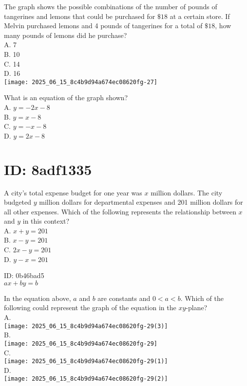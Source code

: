 The graph shows the possible combinations of the number of pounds of tangerines and lemons that could be purchased for $\$ 18$ at a certain store. If Melvin purchased lemons and 4 pounds of tangerines for a total of $\$ 18$, how many pounds of lemons did he purchase?\\
A. 7\\
B. 10\\
C. 14\\
D. 16\\
\texttt{[image: 2025\_06\_15\_8c4b9d94a674ec08620fg-27]}

What is an equation of the graph shown?\\
A. $y=-2 x-8$\\
B. $y=x-8$\\
C. $y=-x-8$\\
D. $y=2 x-8$

\section*{ID: 8adf1335}
A city's total expense budget for one year was $x$ million dollars. The city budgeted $y$ million dollars for departmental expenses and 201 million dollars for all other expenses. Which of the following represents the relationship between $x$ and $y$ in this context?\\
A. $x+y=201$\\
B. $x-y=201$\\
C. $2 x-y=201$\\
D. $y-x=201$

ID: 0b46bad5\\
$a x+b y=b$

In the equation above, $a$ and $b$ are constants and $0<a<b$. Which of the following could represent the graph of the equation in the $x y$-plane?\\
A.\\
\texttt{[image: 2025\_06\_15\_8c4b9d94a674ec08620fg-29(3)]}\\
B.\\
\texttt{[image: 2025\_06\_15\_8c4b9d94a674ec08620fg-29]}\\
C.\\
\texttt{[image: 2025\_06\_15\_8c4b9d94a674ec08620fg-29(1)]}\\
D.\\
\texttt{[image: 2025\_06\_15\_8c4b9d94a674ec08620fg-29(2)]}

